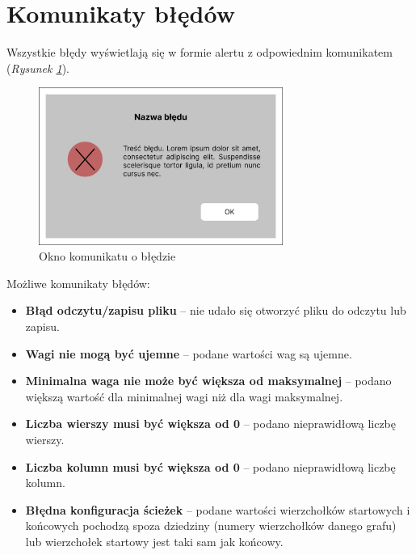 \documentclass{article}
\begin{document}
\newpage

\section{Komunikaty błędów}
Wszystkie błędy wyświetlają się w formie alertu z odpowiednim komunikatem (\emph{Rysunek \ref{fig:gui_error}}).

\begin{figure}[htp]
        \centering
        \includegraphics[width=8cm]{images/gui_error.png}
        \caption{Okno komunikatu o błędzie}
        \label{fig:gui_error}
\end{figure}

Możliwe komunikaty błędów:
\begin{itemize}
    \item \textbf{Błąd odczytu/zapisu pliku} -- nie udało się otworzyć pliku do odczytu lub zapisu.
    \item \textbf{Wagi nie mogą być ujemne} -- podane wartości wag są ujemne.
    \item \textbf{Minimalna waga nie może być większa od maksymalnej} -- podano większą wartość dla minimalnej wagi niż dla wagi maksymalnej.
    \item \textbf{Liczba wierszy musi być większa od 0} -- podano nieprawidłową liczbę wierszy.
    \item \textbf{Liczba kolumn musi być większa od 0} -- podano nieprawidłową liczbę kolumn.
    \item \textbf{Błędna konfiguracja ścieżek} -- podane wartości wierzchołków startowych i końcowych pochodzą spoza dziedziny (numery wierzchołków danego grafu) lub wierzchołek startowy jest taki sam jak końcowy.
\end{itemize}
\end{document}
